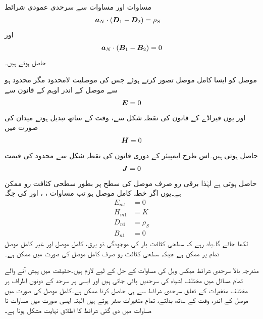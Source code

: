 مساوات  اور مساوات  سے سرحدی عمودی شرائط
\begin{align}\label{مساوات_میکس_ویل_سرحدی_شرائط_بدلتے_میدان_پ}
{\boldsymbol{a}}_N \cdot \left({{\boldsymbol{D}}}_1-{{\boldsymbol{D}}}_2 \right)&=\rho_S
\end{align}
اور
\begin{align}\label{مساوات_میکس_ویل_سرحدی_شرائط_بدلتے_میدان_ت}
{\boldsymbol{a}}_N \cdot \left({{\boldsymbol{B}}}_1-{{\boldsymbol{B}}}_2 \right)=0
\end{align}
حاصل ہوتے ہیں۔

موصل کو ایسا کامل موصل تصور کرتے ہوئے جس کی موصلیت لامحدود مگر  محدود ہو سے موصل کے اندر اوہم کے قانون سے
\begin{align}
{\ensuremath{{\boldsymbol{E}}}}=0
\end{align}
اور یوں فیراڈے کے قانون کی نقطہ شکل سے، وقت کے ساتھ تبدیل ہوتے میدان کی صورت میں
\begin{align}
{\ensuremath{{\boldsymbol{H}}}}=0
\end{align}
حاصل ہوتی ہیں۔اس طرح ایمپیئر کے دوری قانون کی نقطہ شکل سے محدود  کی قیمت
\begin{align}
{\ensuremath{{\boldsymbol{J}}}}=0
\end{align}
حاصل ہوتی ہے لہٰذا برقی رو صرف موصل کی سطح پر بطور سطحی کثافت رو  ممکن ہے۔یوں اگر خطہ  کامل موصل ہو تب مساوات ، ،  اور  کی جگہ
\begin{align}
E_{m1}&=0   \label{مساوات_میکس_ویل_کامل_موصل_سرحدی_شرط_الف}\\
H_{m1}&=K   \label{مساوات_میکس_ویل_کامل_موصل_سرحدی_شرط_ب}\\
D_{n1}&=\rho_S    \label{مساوات_میکس_ویل_کامل_موصل_سرحدی_شرط_پ}\\
B_{n1}&=0    \label{مساوات_میکس_ویل_کامل_موصل_سرحدی_شرط_ت}
\end{align}
لکھا جائے گا۔یاد رہے کہ سطحی کثافت بار کی موجودگی ذو برق، کامل موصل اور غیر کامل موصل تمام پر ممکن ہے جبکہ سطحی کثافت رو  صرف کامل موصل کی صورت میں ممکن ہے۔

مندرجہ بالا سرحدی شرائط میکس ویل کی مساوات کے حل کے لیے لازم  ہیں۔حقیقت میں پیش آنے والے تمام مسائل میں مختلف اشیاء کی سرحدیں پائی جاتی ہیں اور ایسی ہر سرحد کے دونوں اطراف پر مختلف متغیرات کے تعلق سرحدی شرائط سے ہی حاصل کرنا ممکن ہے۔کامل موصل کی صورت میں موصل کے اندر،  وقت کے ساتھ بدلتے، تمام متغیرات صفر ہوتے ہیں البتہ ایسی صورت میں مساوات  تا مساوات  میں  دی گئی شرائط کا اطلاق نہایت مشکل ہوتا ہے۔

